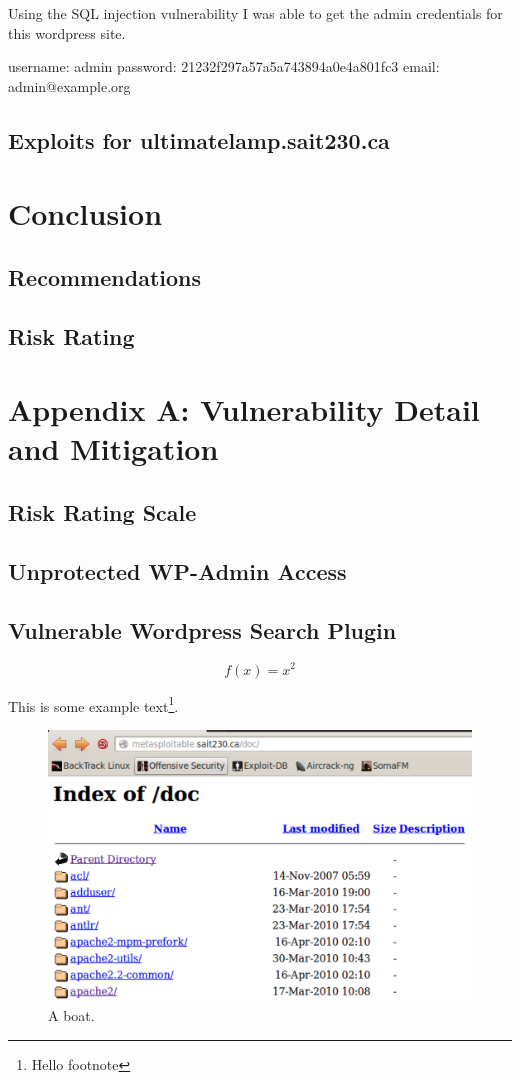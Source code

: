 \documentclass{article}
\begin{document}
Using the SQL injection vulnerability I was able to get the admin credentials
for this wordpress site.

username: admin
password: 21232f297a57a5a743894a0e4a801fc3
email: admin@example.org

\subsection{Exploits for ultimatelamp.sait230.ca}

\newpage
\section{Conclusion}
\subsection{Recommendations}
\subsection{Risk Rating}

\newpage
\section{Appendix A: Vulnerability Detail and Mitigation}
\subsection{Risk Rating Scale}
\subsection{Unprotected WP-Admin Access}
\subsection{Vulnerable Wordpress Search Plugin}

\begin{equation*}
	f(x) = x^2
\end{equation*}

This is some example text\footnote{\label{myfootnote}Hello footnote}.

\begin{figure}[h!]
	\includegraphics[width=\linewidth]{images/screenshot.png}
	\caption{A boat.}
	\label{fig:boat1}
\end{figure}
\end{document}
